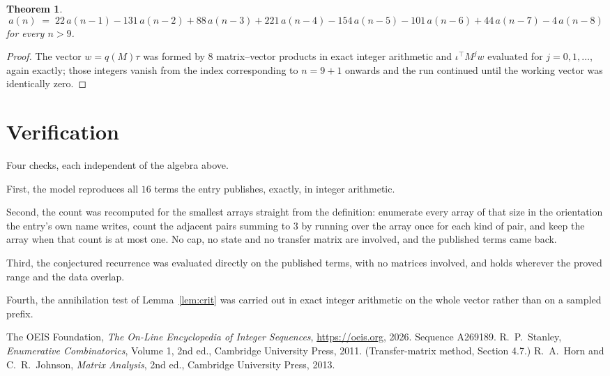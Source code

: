 \documentclass[11pt,a4paper]{article}
\theoremstyle{plain}
\newtheorem{theorem}{Theorem}
\theoremstyle{definition}
\begin{document}
\begin{theorem}
\[
a(n)\;=\;22\,a(n-1) - 131\,a(n-2) + 88\,a(n-3) + 221\,a(n-4) - 154\,a(n-5) - 101\,a(n-6) + 44\,a(n-7) - 4\,a(n-8)
\]
for every $n>9$.
\end{theorem}

\begin{proof}
The vector $w=q(M)\tau$ was formed by $8$ matrix--vector products in exact integer
arithmetic and $\iota^{\!\top}M^{j}w$ evaluated for $j=0,1,\dots$, again exactly; those
integers vanish from the index corresponding to $n=9+1$ onwards and the run continued
until the working vector was identically zero.
\end{proof}

\section{Verification}

Four checks, each independent of the algebra above.

First, the model reproduces all $16$ terms the entry publishes, exactly, in integer
arithmetic.

Second, the count was recomputed for the smallest arrays straight from the definition:
enumerate every array of that size in the orientation the entry's own name writes, count the
adjacent pairs summing to $3$ by running over the array once for each kind of pair, and keep
the array when that count is at most one. No cap, no state and no transfer matrix are involved, and
the published terms came back.

Third, the conjectured recurrence was evaluated directly on the published terms, with no
matrices involved, and holds wherever the proved range and the data overlap.

Fourth, the annihilation test of Lemma~\ref{lem:crit} was carried out in exact integer
arithmetic on the whole vector rather than on a sampled prefix.

\begin{thebibliography}{9}
 The OEIS Foundation, \emph{The On-Line Encyclopedia of Integer
Sequences}, \url{https://oeis.org}, 2026. Sequence A269189.
 R.~P.~Stanley, \emph{Enumerative Combinatorics}, Volume 1, 2nd ed.,
Cambridge University Press, 2011. (Transfer-matrix method, Section 4.7.)
 R.~A.~Horn and C.~R.~Johnson, \emph{Matrix Analysis}, 2nd ed., Cambridge
University Press, 2013.
\end{thebibliography}
\end{document}
